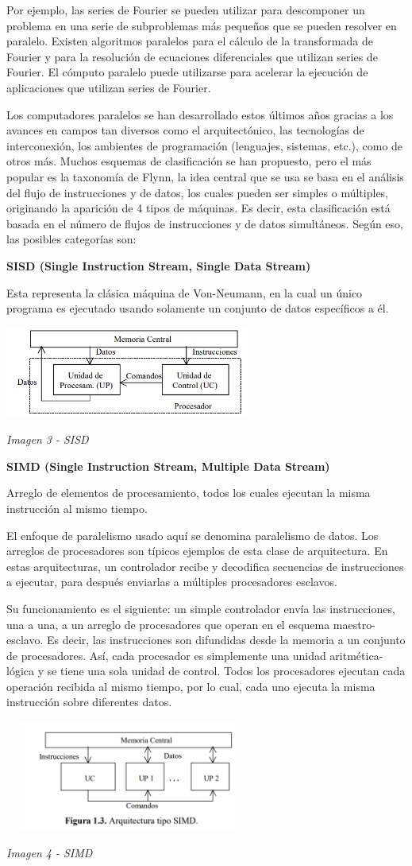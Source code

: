 Por ejemplo, las series de Fourier se pueden utilizar para descomponer un problema en una serie de subproblemas más pequeños que se pueden resolver en paralelo. Existen algoritmos paralelos para el cálculo de la transformada de Fourier y para la resolución de ecuaciones diferenciales que utilizan series de Fourier. El cómputo paralelo puede utilizarse para acelerar la ejecución de aplicaciones que utilizan series de Fourier.

Los computadores paralelos se han desarrollado estos últimos años gracias a los avances en campos tan diversos como el arquitectónico, las tecnologías de interconexión, los ambientes de programación (lenguajes, sistemas, etc.), como de otros más. Muchos esquemas de clasificación se han propuesto, pero el más popular es la taxonomía de Flynn, la idea central que se usa se basa en el análisis del flujo de instrucciones y de datos, los cuales pueden ser simples o múltiples, originando la aparición de 4 tipos de máquinas. Es decir, esta clasificación está basada en el número de flujos de instrucciones y de datos simultáneos. Según eso, las posibles categorías son:

\textbf{SISD (Single Instruction Stream, Single Data Stream)}

Esta representa la clásica máquina de Von-Neumann, en la cual un único programa es ejecutado usando solamente un conjunto de datos específicos a él.

\includegraphics[width=3.18229in,height=1.17579in]{media/image38.png}

\emph{Imagen 3 - SISD}

\textbf{SIMD (Single Instruction Stream, Multiple Data Stream)}

Arreglo de elementos de procesamiento, todos los cuales ejecutan la misma instrucción al mismo tiempo.

El enfoque de paralelismo usado aquí se denomina paralelismo de datos. Los arreglos de procesadores son típicos ejemplos de esta clase de arquitectura. En estas arquitecturas, un controlador recibe y decodifica secuencias de instrucciones a ejecutar, para después enviarlas a múltiples procesadores esclavos.

Su funcionamiento es el siguiente: un simple controlador envía las instrucciones, una a una, a un arreglo de procesadores que operan en el esquema maestro-esclavo. Es decir, las instrucciones son difundidas desde la memoria a un conjunto de procesadores. Así, cada procesador es simplemente una unidad aritmética-lógica y se tiene una sola unidad de control. Todos los procesadores ejecutan cada operación recibida al mismo tiempo, por lo cual, cada uno ejecuta la misma instrucción sobre diferentes datos.

\includegraphics[width=3.19271in,height=1.43274in]{media/image33.png}

\emph{Imagen 4 - SIMD}
